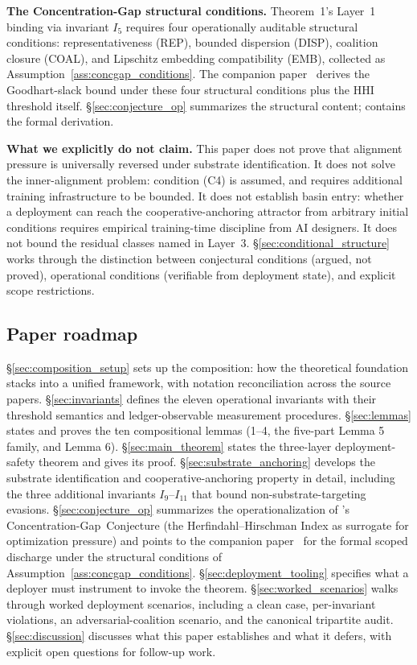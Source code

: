 \textbf{The Concentration-Gap structural conditions.} Theorem~1's Layer~1
binding via invariant $I_5$ requires four operationally auditable structural
conditions: representativeness (REP), bounded dispersion (DISP), coalition
closure (COAL), and Lipschitz embedding compatibility (EMB), collected as
Assumption~\ref{ass:concgap_conditions}. The companion
paper~\citep{lasser2026foundations} derives the Goodhart-slack bound under
these four structural conditions plus the HHI threshold itself.
\S\ref{sec:conjecture_op} summarizes the structural content;
\citep[\S 4]{lasser2026foundations} contains the formal derivation.

\textbf{What we explicitly do not claim.}  This paper does not prove that
alignment pressure is universally reversed under substrate identification.  It
does not solve the inner-alignment problem: condition (C4) is assumed, and
requires additional training infrastructure to be bounded.  It does not
establish basin entry: whether a deployment can reach the cooperative-anchoring
attractor from arbitrary initial conditions requires empirical training-time
discipline from AI designers.  It does not bound the residual classes named in
Layer~3. \S\ref{sec:conditional_structure} works through the distinction
between conjectural conditions (argued, not proved), operational conditions
(verifiable from deployment state), and explicit scope restrictions.

\subsection{Paper roadmap}
\label{sec:roadmap}

\S\ref{sec:composition_setup} sets up the composition: how the theoretical
foundation stacks into a unified framework, with notation reconciliation across
the source papers. \S\ref{sec:invariants} defines the eleven operational
invariants with their threshold semantics and ledger-observable measurement
procedures. \S\ref{sec:lemmas} states and proves the ten compositional lemmas
(1--4, the five-part Lemma 5 family, and Lemma 6).
\S\ref{sec:main_theorem} states the three-layer deployment-safety theorem and
gives its proof.
\S\ref{sec:substrate_anchoring} develops the substrate identification and
cooperative-anchoring property in detail, including the three additional
invariants $I_9$--$I_{11}$ that bound non-substrate-targeting evasions.
\S\ref{sec:conjecture_op} summarizes the operationalization of
\citep[Microfoundation]{lasser2026micro}'s Concentration-Gap~Conjecture (the
Herfindahl--Hirschman Index as surrogate for optimization pressure) and points
to the companion paper~\citep{lasser2026foundations} for the formal scoped
discharge under the structural conditions of
Assumption~\ref{ass:concgap_conditions}.
\S\ref{sec:deployment_tooling} specifies what a deployer must instrument to
invoke the theorem. \S\ref{sec:worked_scenarios} walks through worked
deployment scenarios, including a clean case, per-invariant violations, an
adversarial-coalition scenario, and the canonical tripartite audit.
\S\ref{sec:discussion} discusses what this paper establishes and what it
defers, with explicit open questions for follow-up work.
